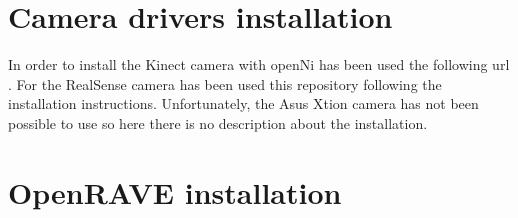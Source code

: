 \documentclass[12pt,a4paper,final,twoside,openright]{report}
\begin{document}
\section{Camera drivers installation}
\label{app:camera_instal}

In order to install the Kinect camera with openNi has been used the following url \cite{Li}. For the RealSense camera has been used this repository \cite{gitRealSense} following the installation instructions. Unfortunately, the Asus Xtion camera has not been possible to use so here there is no description about the installation.

\section{OpenRAVE installation}
\label{app:ikfast}
 
\end{document}

